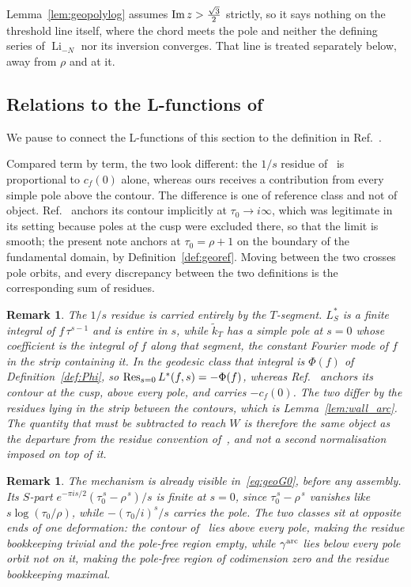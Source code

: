 \documentclass[11pt]{article}
\newtheorem{remark}[theorem]{Remark}
\newcommand{\tk}{\widetilde{k}_T}
\DeclareMathOperator{\Li}{Li}
\begin{document}
Lemma~\ref{lem:geopolylog} assumes ${\rm Im}\,z>\tfrac{\sqrt3}{2}$ strictly, so it says nothing on
the threshold line itself, where the chord meets the pole and neither the defining series of
$\Li_{-N}$ nor its inversion converges. That line is treated separately below, away from $\rho$
and at it.

\subsection{Relations to the L-functions of~\cite{1806}}\label{sec:arc1806}

We pause to connect the L-functions of this section to the definition in Ref.~\cite{1806}.

Compared term by term, the two look different: the $1/s$ residue of~\cite{1806} is proportional to
$c_f(0)$ alone, whereas ours receives a contribution from every simple pole above the contour. The
difference is one of reference class and not of object. Ref.~\cite{1806} anchors its contour
implicitly at $\tau_0\to i\infty$, which was legitimate in its setting because poles at the cusp
were excluded there, so that the limit is smooth; the present note anchors at $\tau_0=\rho+1$ on
the boundary of the fundamental domain, by Definition~\ref{def:georef}. Moving between the two
crosses pole orbits, and every discrepancy between the two definitions is the corresponding sum of
residues.

\begin{remark}\label{rem:arcresidue}
\emph{The $1/s$ residue is carried entirely by the $T$-segment. $L^*_S$ is a finite integral of
$f\,\tau^{s-1}$ and is entire in $s$, while $\tk$ has a simple pole at $s=0$ whose coefficient is
the integral of $f$ along that segment, the constant Fourier mode of $f$ in the strip containing
it. In the geodesic class that integral is $\Phi(f)$ of Definition~\ref{def:Phi}, so
$\mathop{\rm Res}_{s=0}L^*(f,s)=-\Phi(f)$, whereas Ref.~\cite{1806} anchors its contour at the cusp,
above every pole, and carries $-c_f(0)$. The two differ by the residues lying in the strip between
the contours, which is Lemma~\ref{lem:wall_arc}. The quantity that must be subtracted to reach $W$
is therefore the same object as the departure from the residue convention of~\cite{1806}, and not a
second normalisation imposed on top of it.}
\end{remark}

\begin{remark}\label{rem:arcextremal}
\emph{The mechanism is already visible in~\eqref{eq:geoG0}, before any assembly. Its $S$-part
$e^{-\pi is/2}(\tau_0^{\,s}-\rho^{\,s})/s$ is finite at $s=0$, since $\tau_0^{\,s}-\rho^{\,s}$
vanishes like $s\log(\tau_0/\rho)$, while $-(\tau_0/i)^{s}/s$ carries the pole. The two classes sit
at opposite ends of one deformation: the contour of~\cite{1806} lies above every pole, making the
residue bookkeeping trivial and the pole-free region empty, while $\gamma^{\rm arc}$ lies below
every pole orbit not on it, making the pole-free region of codimension zero and the residue
bookkeeping maximal.}
\end{remark}
\end{document}
